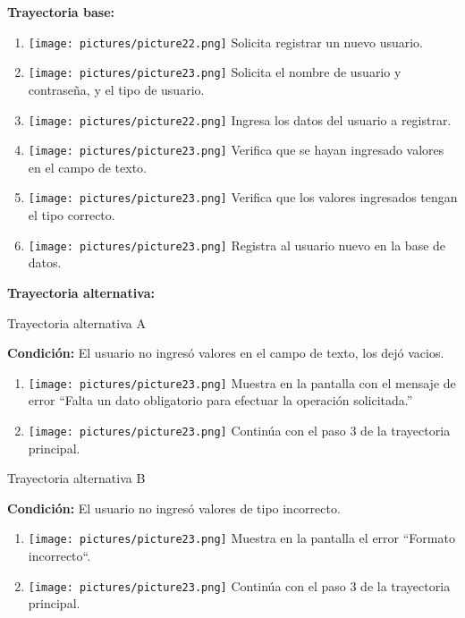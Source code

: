 \textbf{Trayectoria base:}
\begin{enumerate}
\item \texttt{[image: pictures/picture22.png]} Solicita registrar un nuevo usuario.
\item \texttt{[image: pictures/picture23.png]} Solicita el nombre de usuario y contraseña, y el tipo de usuario.
\item \texttt{[image: pictures/picture22.png]} Ingresa los datos del usuario a registrar.
\item \texttt{[image: pictures/picture23.png]} Verifica que se hayan ingresado valores en el campo de texto.
\item \texttt{[image: pictures/picture23.png]} Verifica que los valores ingresados tengan el tipo correcto.
\item \texttt{[image: pictures/picture23.png]} Registra al usuario nuevo en la base de datos.
\end{enumerate}
\textbf{Trayectoria alternativa:} 

{\large Trayectoria alternativa A \par}
\vspace{0.3em}
\textbf{Condición:} El usuario no ingresó valores en el campo de texto, los dejó vacios.
\begin{enumerate}
\item \texttt{[image: pictures/picture23.png]} Muestra en la pantalla con el mensaje de error ``Falta un dato obligatorio para efectuar la operación solicitada.''
\item \texttt{[image: pictures/picture23.png]} Continúa con el paso 3 de la trayectoria principal.
\end{enumerate}
{\large Trayectoria alternativa B \par}
\vspace{0.3em}
\textbf{Condición:} El usuario no ingresó valores de tipo incorrecto.
\begin{enumerate}
\item \texttt{[image: pictures/picture23.png]} Muestra en la pantalla el error ``Formato incorrecto``.
\item \texttt{[image: pictures/picture23.png]} Continúa con el paso 3 de la trayectoria principal.
\end{enumerate}


